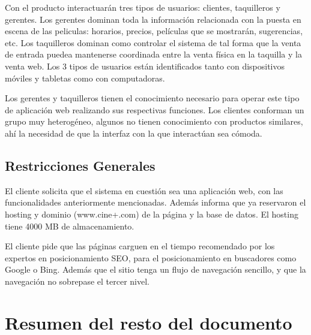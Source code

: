 Con el producto interactuarán tres tipos de usuarios: clientes, taquilleros y gerentes. Los gerentes dominan toda la información relacionada con la puesta en escena de las peliculas: horarios, precios, películas que se mostrarán, sugerencias, etc. Los taquilleros dominan como controlar el sistema de tal forma que la venta de entrada puedea mantenerse coordinada entre la venta física en la taquilla y la venta web. Los 3 tipos de usuarios están identificados tanto con dispositivos móviles y tabletas como con computadoras.

Los gerentes y taquilleros tienen el conocimiento necesario para operar este tipo de aplicación web realizando sus respectivas funciones. Los clientes conforman un grupo muy heterogéneo, algunos no tienen conocimiento con productos similares, ahí la necesidad de que la interfaz con la que interactúan sea cómoda.

\subsection{Restricciones Generales}

El cliente solicita que el sistema en cuestión sea una aplicación web, con las funcionalidades anteriormente mencionadas. Además informa que ya reservaron el hosting y dominio (www.cine+.com) de la página y la base de datos. El hosting tiene 4000 MB de almacenamiento.

El cliente pide que las páginas carguen en el tiempo recomendado por los expertos en posicionamiento SEO, para el posicionamiento en buscadores como Google o Bing. Además que el sitio tenga un flujo de navegación sencillo, y que la navegación no sobrepase el tercer nivel.

\section{Resumen del resto del documento}

